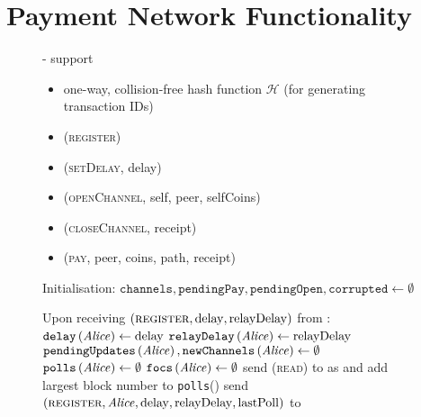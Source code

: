 \section{Payment Network Functionality}
  \begin{figure}[H]
    \begin{systembox}{\fpaynet - support}
        \begin{itemize}
          \item one-way, collision-free hash function $\mathcal{H}$ (for
          generating transaction IDs)
        \end{itemize}

        \begin{itemize}
          \item (\textsc{register})
          \item (\textsc{setDelay}, delay)
          \item (\textsc{openChannel}, self, peer, selfCoins)
          \item (\textsc{closeChannel}, receipt)
          \item (\textsc{pay}, peer, coins, path, receipt)
        \end{itemize}

      \begin{algorithmic}[1]
        \State Initialisation:
        \Indent
          \State $\mathtt{channels}, \mathtt{pendingPay}, \mathtt{pendingOpen},
          \mathtt{corrupted} \gets \emptyset$
        \EndIndent
        \Statex

        \State Upon receiving $\left(\textsc{register}, \mathrm{delay},
        \mathrm{relayDelay}\right)$ from \alice:
        \Indent
          \State $\mathtt{delay}\left(\mathit{Alice}\right) \gets \mathrm{delay}$
          \State $\mathtt{relayDelay}\left(\mathit{Alice}\right) \gets
          \mathrm{relayDelay}$
          \State $\mathtt{pendingUpdates}\left(\mathit{Alice}\right),
          \mathtt{newChannels}\left(\mathit{Alice}\right) \gets \emptyset$
          \State $\mathtt{polls}\left(\mathit{Alice}\right) \gets \emptyset$
          \State $\mathtt{focs}\left(\mathit{Alice}\right) \gets \emptyset$
          \State send (\textsc{read}) to \ledger{} as \alice{} and add largest
          block number to \texttt{polls}(\alice)
          \label{alg:fpaynet:support:lastpoll}
          \State send $\left(\textsc{register}, \mathit{Alice}, \mathrm{delay},
          \mathrm{relayDelay}, \mathrm{lastPoll}\right)$ to \simulator
        \EndIndent
        \Statex


\end{algorithmic}
\end{systembox}
\end{figure}
